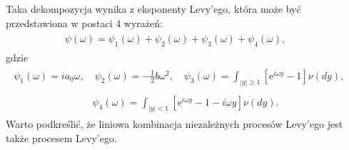 \documentclass[a4paper,12pt,polish]{sphinxmanual}
\begin{document}
Taka dekompozycja wynika z eksponenty Levy'ego, która może być przedstawiona w postaci 4 wyrażeń:
\label{ch3/chIII021:equation-eqn58}\begin{gather}
\begin{split}\psi(\omega) = \psi_1(\omega) +\psi_2(\omega) +\psi_3(\omega) +\psi_4(\omega), \qquad\end{split}\label{ch3/chIII021-eqn58}
\end{gather}
gdzie
\label{ch3/chIII021:equation-eqn59}\begin{gather}
\begin{split}\psi_1(\omega) = i a_0 \omega, \quad \psi_2(\omega) = -\frac{1}{2} b \omega^2, \quad \psi_3(\omega) = \int_{|y| \ge 1} \left[\mbox{e}^{i\omega y} - 1 \right] \nu (dy), \qquad\end{split}\label{ch3/chIII021-eqn59}
\end{gather}\label{ch3/chIII021:equation-eqn60}\begin{gather}
\begin{split}\psi_4(\omega) = \int_{|y| < 1} \left[\mbox{e}^{i\omega y} - 1 - i\omega y \right] \nu (dy).\end{split}\label{ch3/chIII021-eqn60}
\end{gather}
Warto podkreślić, że liniowa kombinacja niezależnych procesów Levy'ego jest także procesem Levy'ego.
\end{document}
